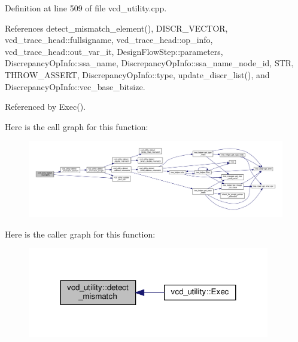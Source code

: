 Definition at line 509 of file vcd\+\_\+utility.\+cpp.



References detect\+\_\+mismatch\+\_\+element(), D\+I\+S\+C\+R\+\_\+\+V\+E\+C\+T\+OR, vcd\+\_\+trace\+\_\+head\+::fullsigname, vcd\+\_\+trace\+\_\+head\+::op\+\_\+info, vcd\+\_\+trace\+\_\+head\+::out\+\_\+var\+\_\+it, Design\+Flow\+Step\+::parameters, Discrepancy\+Op\+Info\+::ssa\+\_\+name, Discrepancy\+Op\+Info\+::ssa\+\_\+name\+\_\+node\+\_\+id, S\+TR, T\+H\+R\+O\+W\+\_\+\+A\+S\+S\+E\+RT, Discrepancy\+Op\+Info\+::type, update\+\_\+discr\+\_\+list(), and Discrepancy\+Op\+Info\+::vec\+\_\+base\+\_\+bitsize.



Referenced by Exec().

Here is the call graph for this function\+:
\nopagebreak
\begin{figure}[H]
\begin{center}
\leavevmode
\includegraphics[width=350pt]{d8/d51/classvcd__utility_a29d328311cf59d9e96c777dbd4c7734e_cgraph}
\end{center}
\end{figure}
Here is the caller graph for this function\+:
\nopagebreak
\begin{figure}[H]
\begin{center}
\leavevmode
\includegraphics[width=299pt]{d8/d51/classvcd__utility_a29d328311cf59d9e96c777dbd4c7734e_icgraph}
\end{center}
\end{figure}
\mbox{\label{classvcd__utility_a83e132ad97a12d201e14274c167bb2b6}} 
